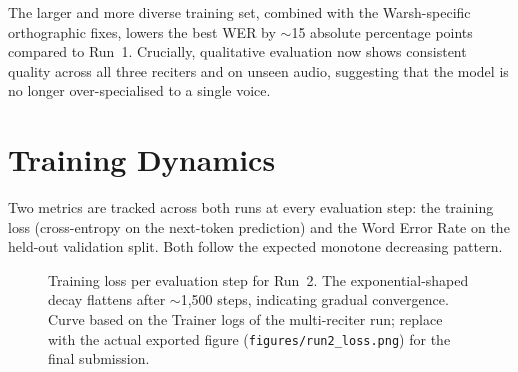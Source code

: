 \documentclass[12pt,a4paper]{report}
\begin{document}
The larger and more diverse training set, combined with the
Warsh-specific orthographic fixes, lowers the best WER by $\sim$15
absolute percentage points compared to Run~1. Crucially, qualitative
evaluation now shows consistent quality across all three reciters and on
unseen audio, suggesting that the model is no longer over-specialised
to a single voice.

\section{Training Dynamics}

Two metrics are tracked across both runs at every evaluation step:
the training loss (cross-entropy on the next-token prediction) and the
Word Error Rate on the held-out validation split. Both follow the
expected monotone decreasing pattern.

\begin{figure}[H]
  \centering
  \caption[Training loss curve (Run 2)]{Training loss per evaluation
  step for Run~2. The exponential-shaped decay flattens after
  $\sim$1{,}500 steps, indicating gradual convergence. Curve based on
  the Trainer logs of the multi-reciter run; replace with the actual
  exported figure (\texttt{figures/run2\_loss.png}) for the final
  submission.}
  \label{fig:mt_run2_loss}
\end{figure}
\end{document}
